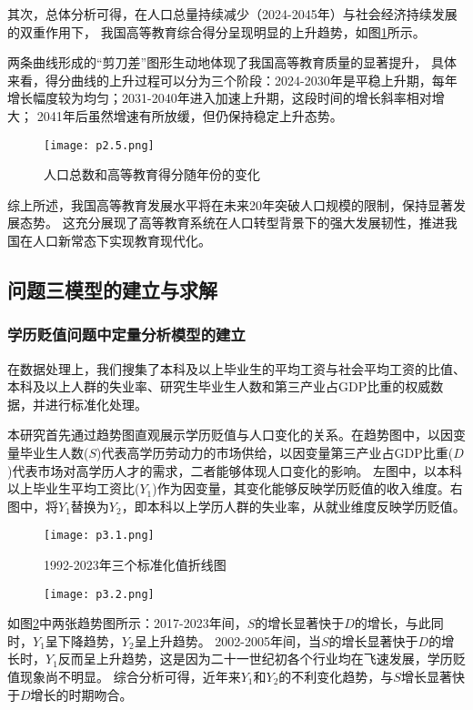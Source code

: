 \documentclass[withoutpreface,bwprint]{cumcmthesis} %
\begin{document}
其次，总体分析可得，在人口总量持续减少（2024-2045年）与社会经济持续发展的双重作用下，
我国高等教育综合得分呈现明显的上升趋势，如图\ref{question2.2}所示。

两条曲线形成的“剪刀差”图形生动地体现了我国高等教育质量的显著提升，
具体来看，得分曲线的上升过程可以分为三个阶段：2024-2030年是平稳上升期，每年增长幅度较为均匀；2031-2040年进入加速上升期，这段时间的增长斜率相对增大；
2041年后虽然增速有所放缓，但仍保持稳定上升态势。

\begin{figure}[H]
    \centering
    \caption{人口总数和高等教育得分随年份的变化}
    \texttt{[image: p2.5.png]} %
	\label{question2.2} %
\end{figure}

综上所述，我国高等教育发展水平将在未来20年突破人口规模的限制，保持显著发展态势。
这充分展现了高等教育系统在人口转型背景下的强大发展韧性，推进我国在人口新常态下实现教育现代化。
\subsection{问题三模型的建立与求解}

\subsubsection{学历贬值问题中定量分析模型的建立}

在数据处理上，我们搜集了本科及以上毕业生的平均工资与社会平均工资的比值、本科及以上人群的失业率、研究生毕业生人数和第三产业占GDP比重的权威数据，并进行标准化处理。

本研究首先通过趋势图直观展示学历贬值与人口变化的关系。在趋势图中，以因变量毕业生人数($S$)代表高学历劳动力的市场供给，以因变量第三产业占GDP比重($D$)代表市场对高学历人才的需求，二者能够体现人口变化的影响。
左图中，以本科以上毕业生平均工资比($Y_1$)作为因变量，其变化能够反映学历贬值的收入维度。右图中，将$Y_1$替换为$Y_2$，即本科以上学历人群的失业率，从就业维度反映学历贬值。

\begin{figure}[H]
    \centering
    \caption{1992-2023年三个标准化值折线图}
    \texttt{[image: p3.1.png]} %
	\label{question3.1} %
\end{figure}

\begin{figure}[H]
    \centering
    \texttt{[image: p3.2.png]} %
\end{figure}
如图\ref{question3.1}中两张趋势图所示：2017-2023年间，$S$的增长显著快于$D$的增长，与此同时，$Y_1$呈下降趋势，$Y_2$呈上升趋势。
2002-2005年间，当$S$的增长显著快于$D$的增长时，$Y_1$反而呈上升趋势，这是因为二十一世纪初各个行业均在飞速发展，学历贬值现象尚不明显。
综合分析可得，近年来$Y_1$和$Y_2$的不利变化趋势，与$S$增长显著快于$D$增长的时期吻合。
\end{document}
